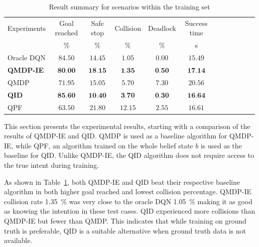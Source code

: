 \begin{table}
	\caption{Result summary for scenarios within the training set}
	\label{tab:belief_results_summary}
	\begin{tabularx}{\columnwidth}{@{}l*{10}{c}c@{}}
	\toprule
	Experiments     & Goal reached & Safe stop & Collision & Deadlock & Success time \\ 
			 & $\%$ & $\%$ & $\%$ & $\%$ & s & \\ 
	\midrule
	Oracle DQN    & $84.50$ & $14.45$ & $1.05$ & $0.00$ & $15.49$\\ %
	\textbf{QMDP-IE}   & $\textbf{80.00}$ & $\textbf{18.15}$ & $\textbf{1.35}$ & $\textbf{0.50}$ & $\textbf{17.14}$ \\ 
	QMDP      & $71.95$ & $15.05$ & $5.70$ & $7.30$ & $20.56$ \\ 
	\textbf{QID}       & $\textbf{85.60}$ & $\textbf{10.40}$ & $\textbf{3.70}$ & $\textbf{0.30}$ & $\textbf{16.64}$ \\ %
	QPF       & $63.50$ & $21.80$ & $12.15$ & $2.55$ & $16.61$ \\ %
	
	\bottomrule
	\end{tabularx}
\end{table}

This section presents the experimental results, starting with a comparison of the results of QMDP-IE and QID. QMDP is used as a baseline algorithm for QMDP-IE, while QPF, an algorithm trained on the whole belief state $b$ is used as the baseline for QID. Unlike QMDP-IE, the QID algorithm does not require access to the true intent during training.

As shown in Table~\ref{tab:belief_results_summary}, both QMDP-IE and QID beat their respective baseline algorithm in both higher goal reached and lowest collision percentage. QMDP-IE collision rate \SI{1.35}{\percent} was very close to the oracle DQN \SI{1.05}{\percent} making it as good as knowing the intention in these test cases.  
QID experienced more collisions than QMDP-IE but fewer than QMDP. This indicates that while training on ground truth is preferable, QID is a suitable alternative when ground truth data is not available.



